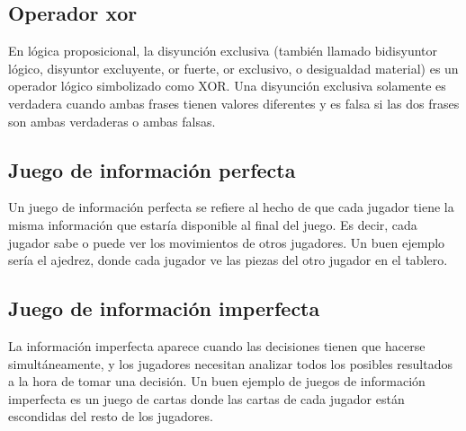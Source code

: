 \subsection{Operador xor}
En lógica proposicional, la disyunción exclusiva (también llamado bidisyuntor lógico, disyuntor excluyente, or fuerte, or exclusivo, o desigualdad material) es un operador lógico simbolizado como XOR. Una disyunción exclusiva solamente es verdadera cuando ambas frases tienen valores diferentes y es falsa si las dos frases son ambas verdaderas o ambas falsas. 

\subsection{Juego de información perfecta}
Un juego de información perfecta se refiere al hecho de que cada jugador tiene la misma información que estaría disponible al final del juego. Es decir, cada jugador sabe o puede ver los movimientos de otros jugadores. Un buen ejemplo sería el ajedrez, donde cada jugador ve las piezas del otro jugador en el tablero.

\subsection{Juego de información imperfecta}
La información imperfecta aparece cuando las decisiones tienen que hacerse simultáneamente, y los jugadores necesitan analizar todos los posibles resultados a la hora de tomar una decisión. Un buen ejemplo de juegos de información imperfecta es un juego de cartas donde las cartas de cada jugador están escondidas del resto de los jugadores.